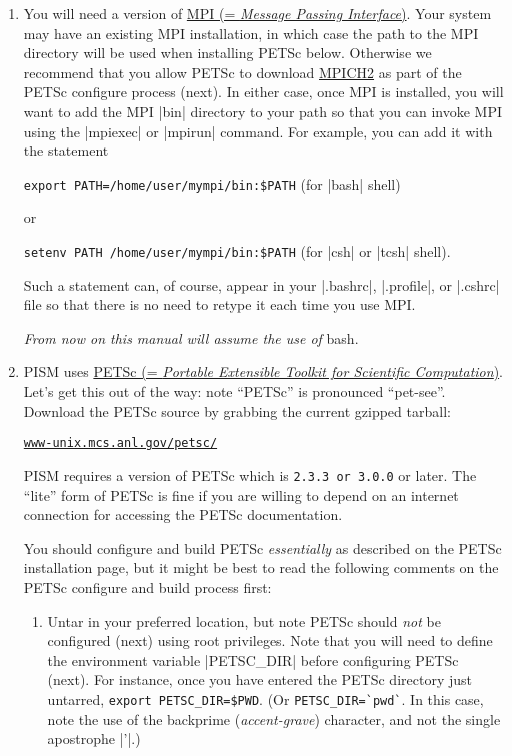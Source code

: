 \documentclass[11pt,final]{amsart}
\newcommand{\PETSCREL}{2.3.3 or 3.0.0}
\renewcommand{\t}[1]{\texttt{#1}}
\newcommand{\und}{\_\!\_}
\begin{document}
\begin{enumerate}
\item You will need a version of \href{http://www-unix.mcs.anl.gov/mpi/}{MPI (= \emph{Message Passing Interface})}. Your system may have an existing MPI installation, in which case the path to the MPI
  directory will be used when installing PETSc below. Otherwise we recommend that you allow PETSc to download
  \href{http://www-unix.mcs.anl.gov/mpi/mpich2/}{MPICH2} as part of the PETSc configure process (next). In either case, once MPI
  is installed, you will want to add the MPI |bin| directory to your path so that you can invoke MPI using the |mpiexec|
  or |mpirun| command. For example, you can add it with the statement

\verb|export PATH=/home/user/mympi/bin:$PATH|  \qquad (for |bash| shell)

\noindent or

\verb|setenv PATH /home/user/mympi/bin:$PATH|  \qquad (for |csh| or |tcsh| shell).

\noindent Such a statement can, of course, appear in your |.bashrc|, |.profile|, or |.cshrc| file so that there is
no need to retype it each time you use MPI.

\medskip
\begin{center}
  \emph{From now on this manual will assume the use of} bash.
\end{center}
\medskip

\item PISM uses \href{http://www-unix.mcs.anl.gov/petsc/}{PETSc (= \emph{Portable Extensible Toolkit for
 Scientific Computation})}.  Let's get this out of the way: note ``PETSc'' is pronounced ``pet-see''.  Download the PETSc source by grabbing the current gzipped tarball:
\begin{center}
    \href{http://www-unix.mcs.anl.gov/petsc/}{\t{www-unix.mcs.anl.gov/petsc/}}
\end{center}
PISM requires a version of PETSc which is \texttt{\PETSCREL} or later.  The ``lite'' form of PETSc is fine if you are willing to depend on an internet connection for accessing the PETSc documentation.

You should configure and build PETSc \emph{essentially} as described on the PETSc installation page, but it might be best to read the following comments on the PETSc configure and build process first:

\renewcommand{\labelenumii}{(\roman{enumii})}\begin{enumerate}
\item Untar in your preferred location, but note PETSc should \emph{not} be configured (next) using root privileges.  Note that you will need to define the environment variable |PETSC_DIR|\index{PETSC\und DIR} before configuring PETSc (next).  For instance, once you have entered the PETSc directory just untarred, \verb|export PETSC_DIR=$PWD|. (Or \verb|PETSC_DIR=`pwd`|.  In this case, note the use of the backprime (\emph{accent-grave}) character, and not the single apostrophe |'|.)


\end{enumerate}
\end{enumerate}
\end{document}
